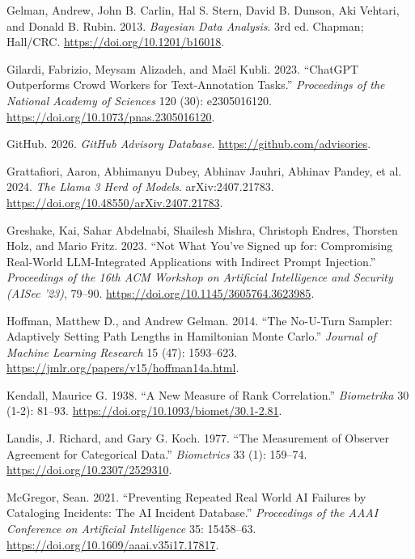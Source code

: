 \documentclass[11pt]{article}
\newlength{\cslhangindent}
\newenvironment{CSLReferences}[2] %
 {\begin{list}{}{%
  \setlength{\itemindent}{0pt}
  \setlength{\leftmargin}{0pt}
  \setlength{\parsep}{0pt}
  \ifodd #1
   \setlength{\leftmargin}{\cslhangindent}
   \setlength{\itemindent}{-1\cslhangindent}
  \fi
  \setlength{\itemsep}{#2\baselineskip}}}
 {\end{list}}
\begin{document}
\begin{CSLReferences}{1}{1}
Gelman, Andrew, John B. Carlin, Hal S. Stern, David B. Dunson, Aki
Vehtari, and Donald B. Rubin. 2013. \emph{Bayesian Data Analysis}. 3rd
ed. Chapman; Hall/CRC. \url{https://doi.org/10.1201/b16018}.

Gilardi, Fabrizio, Meysam Alizadeh, and Maël Kubli. 2023. {``{ChatGPT}
Outperforms Crowd Workers for Text-Annotation Tasks.''}
\emph{Proceedings of the National Academy of Sciences} 120 (30):
e2305016120. \url{https://doi.org/10.1073/pnas.2305016120}.

GitHub. 2026. \emph{{GitHub} Advisory Database}.
\url{https://github.com/advisories}.

{Grattafiori, Aaron, Abhimanyu Dubey, Abhinav Jauhri, Abhinav Pandey, et
al.} 2024. \emph{The Llama 3 Herd of Models}. arXiv:2407.21783.
\url{https://doi.org/10.48550/arXiv.2407.21783}.

Greshake, Kai, Sahar Abdelnabi, Shailesh Mishra, Christoph Endres,
Thorsten Holz, and Mario Fritz. 2023. {``Not What You've Signed up for:
Compromising Real-World {LLM}-Integrated Applications with Indirect
Prompt Injection.''} \emph{Proceedings of the 16th {ACM} Workshop on
Artificial Intelligence and Security ({AISec} '23)}, 79--90.
\url{https://doi.org/10.1145/3605764.3623985}.

Hoffman, Matthew D., and Andrew Gelman. 2014. {``The No-{U}-Turn
Sampler: Adaptively Setting Path Lengths in Hamiltonian {M}onte
{C}arlo.''} \emph{Journal of Machine Learning Research} 15 (47):
1593--623. \url{https://jmlr.org/papers/v15/hoffman14a.html}.

Kendall, Maurice G. 1938. {``A New Measure of Rank Correlation.''}
\emph{Biometrika} 30 (1-2): 81--93.
\url{https://doi.org/10.1093/biomet/30.1-2.81}.

Landis, J. Richard, and Gary G. Koch. 1977. {``The Measurement of
Observer Agreement for Categorical Data.''} \emph{Biometrics} 33 (1):
159--74. \url{https://doi.org/10.2307/2529310}.

McGregor, Sean. 2021. {``Preventing Repeated Real World {AI} Failures by
Cataloging Incidents: The {AI} Incident Database.''} \emph{Proceedings
of the {AAAI} Conference on Artificial Intelligence} 35: 15458--63.
\url{https://doi.org/10.1609/aaai.v35i17.17817}.


\end{CSLReferences}
\end{document}
